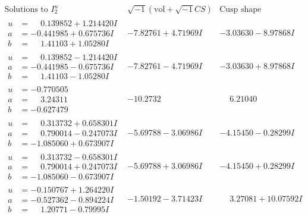 \documentclass[1p]{elsarticle_modified}
\theoremstyle{definition}
\newcommand{\I}{\sqrt{-1}}
\begin{document}
$$\begin{array}{c|c|c}  
\text{Solutions to }I^u_{2}& \I (\text{vol} + \sqrt{-1}CS) & \text{Cusp shape}\\
 \hline 
\begin{aligned}
u &= \phantom{-}0.139852 + 1.214420 I \\
a &= -0.441985 + 0.675736 I \\
b &= \phantom{-}1.41103 + 1.05280 I\end{aligned}
 & -7.82761 + 4.71969 I & -3.03630 - 8.97868 I \\ \hline\begin{aligned}
u &= \phantom{-}0.139852 - 1.214420 I \\
a &= -0.441985 - 0.675736 I \\
b &= \phantom{-}1.41103 - 1.05280 I\end{aligned}
 & -7.82761 - 4.71969 I & -3.03630 + 8.97868 I \\ \hline\begin{aligned}
u &= -0.770505\phantom{ +0.000000I} \\
a &= \phantom{-}3.24311\phantom{ +0.000000I} \\
b &= -0.627479\phantom{ +0.000000I}\end{aligned}
 & -10.2732\phantom{ +0.000000I} & \phantom{-}6.21040\phantom{ +0.000000I} \\ \hline\begin{aligned}
u &= \phantom{-}0.313732 + 0.658301 I \\
a &= \phantom{-}0.790014 - 0.247073 I \\
b &= -1.085060 + 0.673907 I\end{aligned}
 & -5.69788 - 3.06986 I & -4.15450 - 0.28299 I \\ \hline\begin{aligned}
u &= \phantom{-}0.313732 - 0.658301 I \\
a &= \phantom{-}0.790014 + 0.247073 I \\
b &= -1.085060 - 0.673907 I\end{aligned}
 & -5.69788 + 3.06986 I & -4.15450 + 0.28299 I \\ \hline\begin{aligned}
u &= -0.150767 + 1.264220 I \\
a &= -0.527362 - 0.894224 I \\
b &= \phantom{-}1.20771 - 0.79995 I\end{aligned}
 & -1.50192 - 3.71423 I & \phantom{-}3.27081 + 10.07592 I \\ \hline\begin{aligned}

\end{aligned}
\end{array}$$
\end{document}
